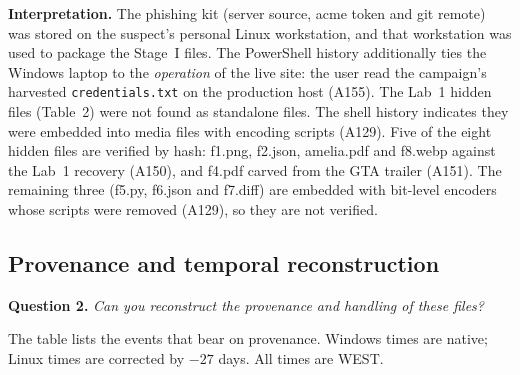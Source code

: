 \documentclass[11pt,a4paper,final,oneside]{article}
\begin{document}
\textbf{Interpretation.} The phishing kit (server source, acme token and git remote) was stored on the suspect's personal Linux workstation, and that workstation was used to package the Stage~I files. The PowerShell history additionally ties the Windows laptop to the \emph{operation} of the live site: the user read the campaign's harvested \texttt{credentials.txt} on the production host (A155). The Lab~1 hidden files (Table~2) were not found as standalone files. The shell history indicates they were embedded into media files with encoding scripts (A129). Five of the eight hidden files are verified by hash: f1.png, f2.json, amelia.pdf and f8.webp against the Lab~1 recovery (A150), and f4.pdf carved from the GTA trailer (A151). The remaining three (f5.py, f6.json and f7.diff) are embedded with bit-level encoders whose scripts were removed (A129), so they are not verified.

\subsection{Provenance and temporal reconstruction}
\label{sec:q2}

\textbf{Question 2.} \textit{Can you reconstruct the provenance and handling of these files?}

The table lists the events that bear on provenance. Windows times are native; Linux times are corrected by $-27$ days. All times are WEST.
\end{document}
